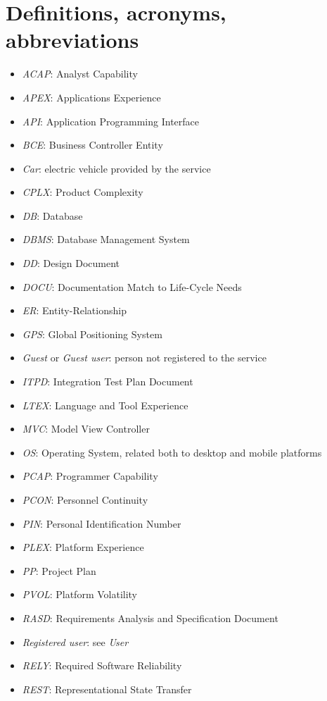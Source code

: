 \section{Definitions, acronyms, abbreviations}
\begin{itemize}
	\item \emph{ACAP}: Analyst Capability
	\item \emph{APEX}: Applications Experience
	\item \emph{API}: Application Programming Interface
	\item \emph{BCE}: Business Controller Entity
	\item \emph{Car}: electric vehicle provided by the service
	\item \emph{CPLX}: Product Complexity
	\item \emph{DB}: Database
	\item \emph{DBMS}: Database Management System
	\item \emph{DD}: Design Document
	\item \emph{DOCU}: Documentation Match to Life-Cycle Needs
	\item \emph{ER}: Entity-Relationship
	\item \emph{GPS}: Global Positioning System
	\item \emph{Guest} or \emph{Guest user}: person not registered to the service
	\item \emph{ITPD}: Integration Test Plan Document
	\item \emph{LTEX}: Language and Tool Experience
	\item \emph{MVC}: Model View Controller
	\item \emph{OS}: Operating System, related both to desktop and mobile platforms
	\item \emph{PCAP}: Programmer Capability
	\item \emph{PCON}: Personnel Continuity
	\item \emph{PIN}: Personal Identification Number
	\item \emph{PLEX}: Platform Experience
	\item \emph{PP}: Project Plan
	\item \emph{PVOL}: Platform Volatility
	\item \emph{RASD}: Requirements Analysis and Specification Document
	\item \emph{Registered user}: see \emph{User}
	\item \emph{RELY}: Required Software Reliability
	\item \emph{REST}: Representational State Transfer

\end{itemize}
